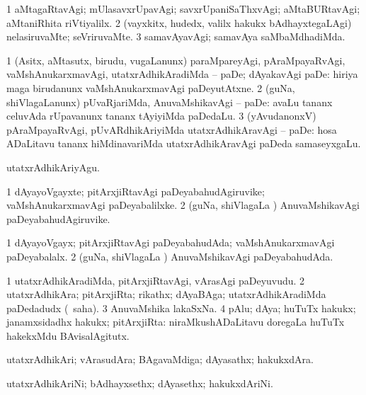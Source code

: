 \bentry
{}
\gl{\kirxvi}
\bmng
\bnum
\num{1} aMtagaRtavAgi; mUlasavxrUpavAgi; savxrUpaniSaThxvAgi; aMtaBURtavAgi; aMtaniRhita riVtiyalilx. 
\num{2} (vayxkitx, hudedx, \mo valilx hakukx bAdhayxtegaLAgi) nelasiruvaMte; seVriruvaMte. 
\num{3} samavAyavAgi; samavAya saMbaMdhadiMda. 
\enum
\emng
\eentry

\bentry
{}
\gl{\sakirx}
\bmng
\bnum
\num{1} (Asitx, aMtasutx, birudu, \mo vugaLanunx) paraMpareyAgi, pAraMpayaRvAgi, vaMshAnukarxmavAgi, utatxrAdhikAradiMda -- paDe; dAyakavAgi paDe:  hiriya maga birudanunx vaMshAnukarxmavAgi paDeyutAtxne. 
\num{2} (guNa, shiVlagaLanunx) pUvaRjariMda, AnuvaMshikavAgi -- paDe:  avaLu tananx celuvAda rUpavanunx tananx tAyiyiMda paDedaLu. 
\num{3} (yAvudanonxV) pAraMpayaRvAgi, pUvARdhikAriyiMda utatxrAdhikAravAgi -- paDe:  hosa ADaLitavu tananx hiMdinavariMda utatxrAdhikAravAgi paDeda samaseyxgaLu. 
\enum
\emng

\noindent 
\gl{\akirx}
\bmng
utatxrAdhikAriyAgu. 
\emng
\eentry

\bentry
{}
\gl{\nA}
\bmng
\bnum
\num{1} dAyayoVgayxte; pitArxjiRtavAgi paDeyabahudAgiruvike; vaMshAnukarxmavAgi paDeyabalilxke. 
\num{2} (guNa, shiVlagaLa \vi) AnuvaMshikavAgi paDeyabahudAgiruvike. 
\enum
\emng
\eentry

\bentry
{}
\gl{\gu}
\bmng
\bnum
\num{1} dAyayoVgayx; pitArxjiRtavAgi paDeyabahudAda; vaMshAnukarxmavAgi paDeyabalalx. 
\num{2} (guNa, shiVlagaLa \vi) AnuvaMshikavAgi paDeyabahudAda. 
\enum
\emng
\eentry

\bentry
{}
\gl{\nA}
\bmng
\bnum
\num{1} utatxrAdhikAradiMda, pitArxjiRtavAgi, vArasAgi paDeyuvudu. 
\num{2} utatxrAdhikAra; pitArxjiRta; rikathx; dAyaBAga; utatxrAdhikAradiMda paDedadudx (\rUpa\ saha). 
\num{3} AnuvaMshika lakaSxNa. 
\num{4} pAlu; dAya; huTuTx hakukx; janamxsidadhx hakukx; pitArxjiRta:  niraMkushADaLitavu doregaLa huTuTx hakekxMdu BAvisalAgitutx. 
\enum
\emng
\eentry

\bentry
{}
\gl{\nA}
\bmng
utatxrAdhikAri; vArasudAra; BAgavaMdiga; dAyasathx; hakukxdAra. 
\emng
\eentry

\bentry
{}
\gl{\nA}
\bmng
utatxrAdhikAriNi; bAdhayxsethx; dAyasethx; hakukxdAriNi. 
\emng
\eentry

